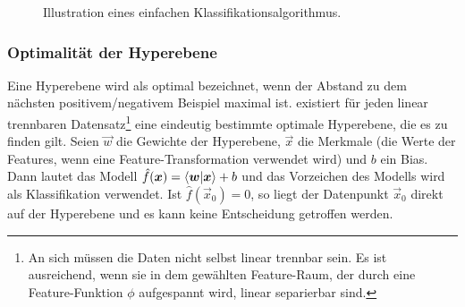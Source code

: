			\begin{figure}
				\centering
				\caption{Illustration eines einfachen Klassifikationsalgorithmus.}
			\end{figure}

			\subsubsection{Optimalität der Hyperebene}
				Eine Hyperebene wird als optimal bezeichnet, wenn der Abstand zu dem nächsten positivem/negativem Beispiel maximal ist. existiert für jeden linear trennbaren Datensatz\footnote{An sich müssen die Daten nicht selbst linear trennbar sein. Es ist ausreichend, wenn sie in dem gewählten Feature-Raum, der durch eine Feature-Funktion \(\phi\) aufgespannt wird, linear separierbar sind.} eine eindeutig bestimmte optimale Hyperebene, die es zu finden gilt. Seien \(\vec{w}\) die Gewichte der Hyperebene, \(\vec{x}\) die Merkmale (\bzw die Werte der Features, wenn eine Feature-Transformation verwendet wird) und \(b\) ein Bias. Dann lautet das Modell \( \hat{f}(\bm{x}) = \braket{\bm{w}}{\bm{x}} + b \) und das Vorzeichen des Modells wird als Klassifikation verwendet. Ist \( \hat{f}(\vec{x}_0) = 0 \), so liegt der Datenpunkt \( \vec{x}_0 \) direkt auf der Hyperebene und es kann keine Entscheidung getroffen werden.

